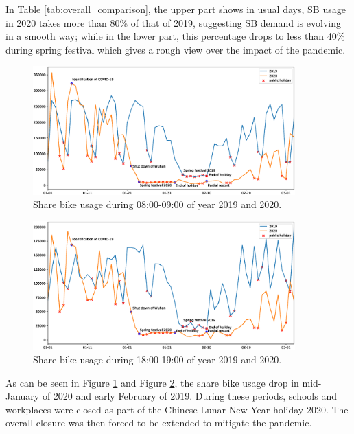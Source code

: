 \documentclass[preprints,ijgi,submit,moreauthors]{Definitions/mdpi}
\begin{document}
In Table \ref{tab:overall_comparison}, the upper part shows in usual days, SB usage in 2020 takes more than 80\% of that of 2019, suggesting SB demand is evolving in a smooth way;
while in the lower part, this percentage drops to less than 40\% during spring festival which gives a rough view over the impact of the pandemic.


\begin{figure}[H]
    \centering
    \includegraphics[width=0.9\textwidth]{Figures/hour_8.eps}
    \caption{Share bike usage during 08:00-09:00 of year 2019 and 2020.}
    \label{fig:hour_comparison_8}
\end{figure}
\begin{figure}[H]
    \centering
    \includegraphics[width=0.9\textwidth]{Figures/hour_18.eps}
    \caption{Share bike usage during 18:00-19:00 of year 2019 and 2020.}
    \label{fig:hour_comparison_18}
\end{figure}

As can be seen in Figure \ref{fig:hour_comparison_8} and Figure \ref{fig:hour_comparison_18}, the share bike usage drop in mid-January of 2020 and early February of 2019.
During these periods, schools and workplaces were closed as part of the Chinese Lunar New Year holiday 2020.
The overall closure was then forced to be extended to mitigate the pandemic.
\end{document}
